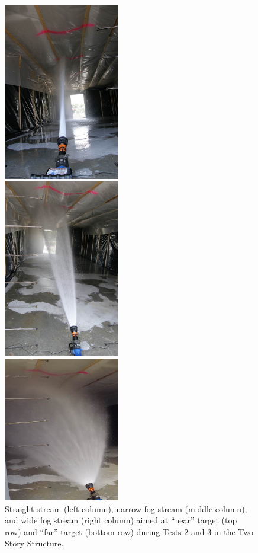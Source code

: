 \documentclass[12pt,oneside]{book}
\begin{document}
\begin{figure}[!ht]
\begin{center}
	\end{center}
	\endminipage \hfill
	\vspace{0.15in}
	\minipage{2.15in}
	\begin{center}
		\includegraphics[width=2in]{../Figures/Pictures/SS_far}
	\end{center} 
	\endminipage \hfill
	\minipage{2.15in}
	\begin{center}
		\includegraphics[width=2in]{../Figures/Pictures/NF_far}
	\end{center}
	\endminipage \hfill
	\minipage{2.15in}
	\begin{center}
		\includegraphics[width=2in]{../Figures/Pictures/WF_far}
	\end{center}
	\endminipage \hfill
	\caption[Straight stream, narrow fog stream, and wide fog stream aimed at the near and far targets in the Two Story Structure.]{Straight stream (left column), narrow fog stream (middle column), and wide fog stream (right column) aimed at ``near'' target (top row) and ``far'' target (bottom row) during Tests 2 and 3 in the Two Story Structure.}
	\label{fig:test_2_3_pic}
\end{figure}
\FloatBarrier
\end{document}
